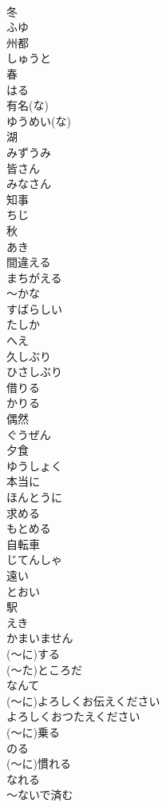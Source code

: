 \documentclass[8pt]{extreport}
\begin{document}
\begin{CJK}{UTF8}{min}
\\	冬	
\\	ふゆ
\\	州都	
\\	しゅうと
\\	春	
\\	はる
\\	有名(な)	
\\	ゆうめい(な)
\\	湖	
\\	みずうみ
\\	皆さん	
\\	みなさん
\\	知事	
\\	ちじ
\\	秋	
\\	あき
\\	間違える	
\\	まちがえる
\\	～かな	
\\	すばらしい	
\\	たしか	
\\	へえ	
\\	久しぶり	
\\	ひさしぶり
\\	借りる	
\\	かりる
\\	偶然	
\\	ぐうぜん
\\	夕食	
\\	ゆうしょく
\\	本当に	
\\	ほんとうに
\\	求める	
\\	もとめる
\\	自転車	
\\	じてんしゃ
\\	遠い	
\\	とおい
\\	駅	
\\	えき
\\	かまいません	
\\	(～に)する	
\\	(～た)ところだ	
\\	なんて	
\\	(～に)よろしくお伝えください	
\\	よろしくおつたえください
\\	(～に)乗る	
\\	のる
\\	(～に)慣れる	
\\	なれる
\\	～ないで済む	

\end{CJK}
\end{document}
